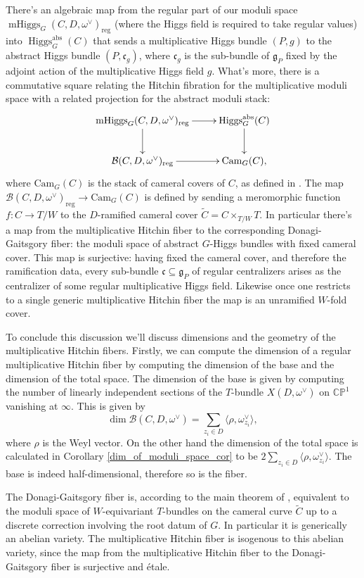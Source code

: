 \documentclass[11pt, oneside, reqno]{amsart}
\theoremstyle{definition} \newtheorem{definition}{Definition}[section]
\theoremstyle{definition} \newtheorem{remark}[definition]{Remark}
\theoremstyle{definition} \newtheorem{remarks}[definition]{Remarks}
\theoremstyle{definition} \newtheorem{question}[definition]{Question}
\theoremstyle{definition} \newtheorem*{note}{Note}
\theoremstyle{definition} \newtheorem{example}[definition]{Example}
\theoremstyle{definition} \newtheorem{examples}[definition]{Examples}
\renewcommand{\gg}{\mathfrak{g}}
\newcommand{\bb}[1]{\mathbb{#1}}
\newcommand{\mr}[1]{\mathrm{#1}}
\newcommand{\mc}[1]{\mathcal{#1}}
\newcommand{\mf}[1]{\mathfrak{#1}}
\newcommand{\wt}[1]{\widetilde{#1}}
\newcommand{\sub}{\subseteq}
\DeclareMathOperator{\higgs}{Higgs}
\DeclareMathOperator{\mhiggs}{mHiggs}
\begin{document}
There's an algebraic map from the regular part of our moduli space $\mhiggs_G(C,D,\omega^\vee)_{\mr{reg}}$ (where the Higgs field is required to take regular values) into $\higgs_G^{\mr{abs}}(C)$ that sends a multiplicative Higgs bundle $(P,g)$ to the abstract Higgs bundle $(P, \mf c_g)$, where $\mf c_g$ is the sub-bundle of $\gg_P$ fixed by the adjoint action of the multiplicative Higgs field $g$.  What's more, there is a commutative square relating the Hitchin fibration for the multiplicative moduli space with a related projection for the abstract moduli stack:
\[\xymatrix{
\mhiggs_G(C,D,\omega^\vee)_{\mr{reg}} \ar[r] \ar[d] &\higgs_G^{\mr{abs}}(C) \ar[d] \\
\mc B(C,D,\omega^\vee)_{\mr{reg}} \ar[r] &\mr{Cam}_G(C),
}\]
where $\mr{Cam}_G(C)$ is the stack of cameral covers of $C$, as defined in \cite[Section 2.8]{DonagiGaitsgory}.  The map $\mc B(C,D,\omega^\vee)_{\mr{reg}} \to \mr{Cam}_G(C)$ is defined by sending a meromorphic function $f \colon C \to T/W$ to the $D$-ramified cameral cover $\wt C = C \times_{T/W} T$.  In particular there's a map from the multiplicative Hitchin fiber to the corresponding Donagi-Gaitsgory fiber: the moduli space of abstract $G$-Higgs bundles with fixed cameral cover.  This map is surjective: having fixed the cameral cover, and therefore the ramification data, every sub-bundle $\mf c \sub \gg_P$ of regular centralizers arises as the centralizer of some regular multiplicative Higgs field.  Likewise once one restricts to a single generic multiplicative Hitchin fiber the map is an unramified $W$-fold cover.

To conclude this discussion we'll discuss dimensions and the geometry of the multiplicative Hitchin fibers.  Firstly, we can compute the dimension of a regular multiplicative Hitchin fiber by computing the dimension of the base and the dimension of the total space.  The dimension of the base is given by computing the number of linearly independent sections of the $T$-bundle $X(D,\omega^\vee)$ on $\bb{CP}^1$ vanishing at $\infty$.  This is given by 
\[\dim \mc B(C,D,\omega^\vee) = \sum_{z_i \in D} \langle \rho, \omega^\vee_{z_i} \rangle,\]
where $\rho$ is the Weyl vector.  On the other hand the dimension of the total space is calculated in Corollary \ref{dim_of_moduli_space_cor} to be $2 \sum_{z_i \in D} \langle \rho, \omega^\vee_{z_i} \rangle$.  The base is indeed half-dimensional, therefore so is the fiber.

The Donagi-Gaitsgory fiber is, according to the main theorem of \cite{DonagiGaitsgory}, equivalent to the moduli space of $W$-equivariant $T$-bundles on the cameral curve $\wt C$ up to a discrete correction involving the root datum of $G$.  In particular it is generically an abelian variety. The multiplicative Hitchin fiber is isogenous to this abelian variety, since the map from the multiplicative Hitchin fiber to the Donagi-Gaitsgory fiber is surjective and \'etale.
\end{document}
